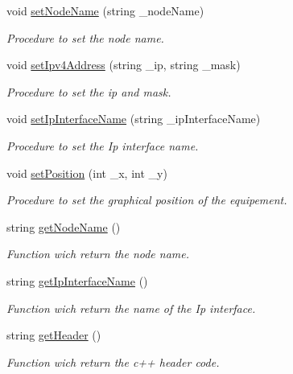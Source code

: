 \begin{CompactItemize}
void \hyperlink{class_equipement_8f83b540ca8ad94b6c70a1d135e66ba6}{setNodeName} (string \_\-nodeName)
\begin{CompactList}\small\item\em Procedure to set the node name. \item\end{CompactList}\item 
void \hyperlink{class_equipement_8ad1b79f648fa6917cff0df9ab8d9240}{setIpv4Address} (string \_\-ip, string \_\-mask)
\begin{CompactList}\small\item\em Procedure to set the ip and mask. \item\end{CompactList}\item 
void \hyperlink{class_equipement_a73b74eda1a7305f94a66611e2b50866}{setIpInterfaceName} (string \_\-ipInterfaceName)
\begin{CompactList}\small\item\em Procedure to set the Ip interface name. \item\end{CompactList}\item 
void \hyperlink{class_equipement_70bc8e8f1b9527a9c54f4ac6bd93a2c7}{setPosition} (int \_\-x, int \_\-y)
\begin{CompactList}\small\item\em Procedure to set the graphical position of the equipement. \item\end{CompactList}\item 
string \hyperlink{class_equipement_b8f87002fae848cffc5761f627a5af45}{getNodeName} ()
\begin{CompactList}\small\item\em Function wich return the node name. \item\end{CompactList}\item 
string \hyperlink{class_equipement_c1bc0f20388d78e67e4d808548ec0e7e}{getIpInterfaceName} ()
\begin{CompactList}\small\item\em Function wich return the name of the Ip interface. \item\end{CompactList}\item 
string \hyperlink{class_equipement_46225506a8202eab2f688ce23e14ce97}{getHeader} ()
\begin{CompactList}\small\item\em Function wich return the c++ header code. \item\end{CompactList}\item 

\end{CompactItemize}
